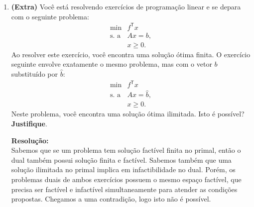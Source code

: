 \documentclass{article}
\newcommand{\T}{\mathsf{T}}
\begin{document}
\begin{enumerate}[resume*=exerc]
\item {\bf (Extra)} Você está resolvendo exercícios de programação linear e se depara com o seguinte problema:
\[
\begin{array}{rl}
\min & f^\T x \\
\text{s. a} & Ax = b, \\
& x \geq 0.
\end{array}
\]
Ao resolver este exercício, você encontra uma solução ótima finita. O exercício seguinte envolve exatamente o mesmo problema, mas com o vetor $b$ substituído por $\hat b$:
\[
\begin{array}{rl}
\min & f^\T x \\
\text{s. a} & Ax = \hat b, \\
& x \geq 0.
\end{array}
\]
Neste problema, você encontra uma solução ótima ilimitada. Isto é possível? {\bf Justifique}.

\begin{framed}
{\bf Resolução:}\\
Sabemos que se um problema tem solução factível finita no primal, então o dual também possui solução finita e factível.
Sabemos também que uma solução ilimitada no primal implica em infactibilidade no dual.
Porém, os problemas duais de ambos exercícios possuem o mesmo espaço factível, que precisa ser factível e infactível simultaneamente para atender as condições propostas.
Chegamos a uma contradição, logo isto não é possível.
\vspace{14cm}
\end{framed}


\end{enumerate}
\end{document}
